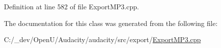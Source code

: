 Definition at line 582 of file Export\+M\+P3.\+cpp.



The documentation for this class was generated from the following file\+:\begin{DoxyCompactItemize}
\item 
C\+:/\+\_\+dev/\+Open\+U/\+Audacity/audacity/src/export/\hyperlink{_export_m_p3_8cpp}{Export\+M\+P3.\+cpp}\end{DoxyCompactItemize}
